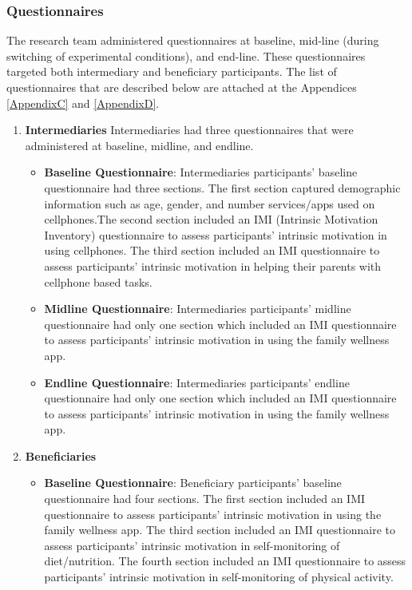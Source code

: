 \subsubsection{Questionnaires}\label{methodsquestionnaire}
The research team administered questionnaires at baseline, mid-line (during switching of experimental conditions), and end-line. These questionnaires targeted both intermediary and beneficiary participants. The list of questionnaires that are described below are attached at the Appendices \ref{AppendixC} and \ref{AppendixD}.
\begin{enumerate}
\item{\textbf{Intermediaries}}
Intermediaries had three questionnaires that were administered at baseline, midline, and endline.
 
\begin{itemize}
\item{\textbf{Baseline Questionnaire}}: Intermediaries participants' baseline questionnaire had three sections. The first section captured demographic information such as age, gender, and number services/apps used on cellphones.The second section included an IMI (Intrinsic Motivation Inventory) questionnaire  to assess participants' intrinsic motivation in using cellphones. The third section included an IMI questionnaire to assess participants' intrinsic motivation in helping their parents with cellphone based tasks. 

\item{\textbf{Midline Questionnaire}}: Intermediaries participants' midline questionnaire had only one section which included an IMI questionnaire  to assess participants' intrinsic motivation in using the family wellness app.

\item{\textbf{Endline Questionnaire}}: Intermediaries participants' endline questionnaire had only one section which included an IMI questionnaire  to assess participants' intrinsic motivation in using the family wellness app.
\end{itemize}

\item{\textbf{Beneficiaries}}

\begin{itemize}
\item{\textbf{Baseline Questionnaire}}: Beneficiary participants' baseline questionnaire had four sections. The first section included an IMI questionnaire  to assess participants' intrinsic motivation in using the family wellness app. The third section included an IMI questionnaire to assess participants' intrinsic motivation in self-monitoring of diet/nutrition. The fourth section included an IMI questionnaire to assess participants' intrinsic motivation in self-monitoring of physical activity.


\end{itemize}
\end{enumerate}

